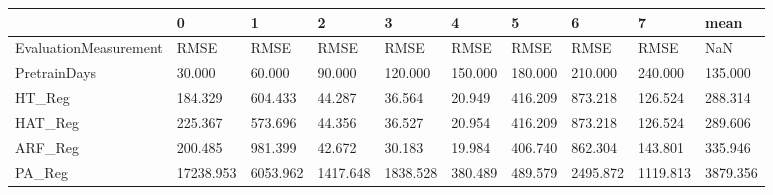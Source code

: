 \begin{tabular}{llllllllll}
\toprule
{} &         0 &        1 &        2 &        3 &       4 &       5 &        6 &        7 &     mean \\
\midrule
EvaluationMeasurement &      RMSE &     RMSE &     RMSE &     RMSE &    RMSE &    RMSE &     RMSE &     RMSE &      NaN \\
PretrainDays          &    30.000 &   60.000 &   90.000 &  120.000 & 150.000 & 180.000 &  210.000 &  240.000 &  135.000 \\
HT\_Reg                &   184.329 &  604.433 &   44.287 &   36.564 &  20.949 & 416.209 &  873.218 &  126.524 &  288.314 \\
HAT\_Reg               &   225.367 &  573.696 &   44.356 &   36.527 &  20.954 & 416.209 &  873.218 &  126.524 &  289.606 \\
ARF\_Reg               &   200.485 &  981.399 &   42.672 &   30.183 &  19.984 & 406.740 &  862.304 &  143.801 &  335.946 \\
PA\_Reg                & 17238.953 & 6053.962 & 1417.648 & 1838.528 & 380.489 & 489.579 & 2495.872 & 1119.813 & 3879.356 \\
\bottomrule
\end{tabular}
